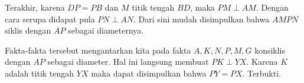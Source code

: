     Terakhir, karena $DP=PB$ dan $M$ titik tengah $BD$, maka $PM \perp AM$. Dengan cara serupa didapat pula $PN \perp AN$. Dari sini mudah disimpulkan bahwa $AMPN$ siklis dengan $AP$ sebagai diameternya.
    
    Fakta-fakta tersebut mengantarkan kita pada fakta $A,K,N,P,M,G$ konsiklis dengan $AP$ sebagai diameter. Hal ini langsung membuat $PK \perp YX$. Karena $K$ adalah titik tengah $YX$ maka dapat disimpulkan bahwa $PY=PX$. Terbukti. 
